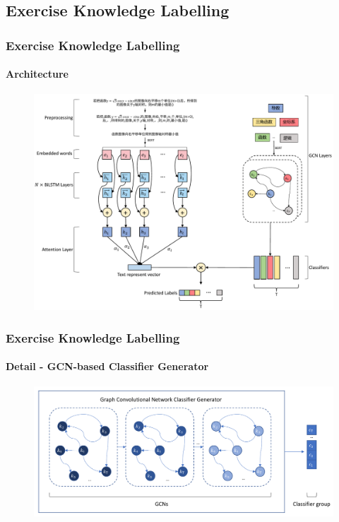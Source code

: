 \documentclass{beamer}
\begin{document}
\subsection{Exercise Knowledge Labelling}
\begin{frame}
	\frametitle{Exercise Knowledge Labelling}
	\framesubtitle{Architecture}
	\begin{figure}
		\centering
		\includegraphics[height=0.80\textheight]{figures/ch2-ov.pdf}
	\end{figure}
\end{frame}

\begin{frame}
	\frametitle{Exercise Knowledge Labelling}
	\framesubtitle{Detail - GCN-based Classifier Generator}
	\begin{figure}
		\centering
		\includegraphics[width=1.0\textwidth]{figures/ch2-gcnclsgen-model.pdf}
	\end{figure}
\end{frame}
\end{document}
